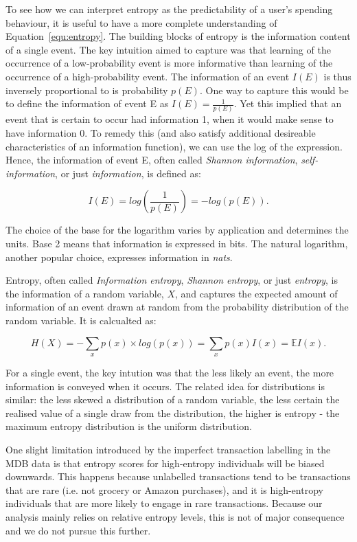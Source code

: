 To see how we can interpret entropy as the predictability of a user's spending
behaviour, it is useful to have a more complete understanding of
Equation~\ref{equ:entropy}. The building blocks of entropy is the information
content of a single event. The key intuition \citet{shannon1948mathematical}
aimed to capture was that learning of the occurrence of a low-probability event
is more informative than learning of the occurrence of a high-probability
event. The information of an event $I(E)$ is thus inversely proportional to is
probability $p(E)$. One way to capture this would be to define the information
of event E as $I(E) = \frac{1}{p(E)}$. Yet this implied that an event that is
certain to occur had information 1, when it would make sense to have
information 0. To remedy this (and also satisfy additional desireable
characteristics of an information function), we can use the log of the
expression. Hence, the information of event E, often called \textit{Shannon
information}, \textit{self-information}, or just \textit{information}, is
defined as:

\begin{equation}
    I(E) = log\left(\frac{1}{p(E)}\right) = -log(p(E)).
\end{equation}

The choice of the base for the logarithm varies by application and determines
the units. Base 2 means that information is expressed in bits. The natural
logarithm, another popular choice, expresses information in \textit{nats}.

Entropy, often called \textit{Information entropy}, \textit{Shannon entropy},
or just \textit{entropy}, is the information of a random variable, $X$, and
captures the expected amount of information of an event drawn at random from
the probability distribution of the random variable. It is calcualted as:

\begin{equation}
    H(X) = -\sum_x p(x) \times log(p(x)) = \sum_x p(x)I(x) = \mathbb{E} I(x).
\end{equation}

For a single event, the key intution was that the less likely an event, the
more information is conveyed when it occurs. The related idea for distributions
is similar: the less skewed a distribution of a random variable, the less
certain the realised value of a single draw from the distribution, the higher
is entropy - the maximum entropy distribution is the uniform distribution.

One slight limitation introduced by the imperfect transaction labelling in the
MDB data is that entropy scores for high-entropy individuals will be biased
downwards. This happens because unlabelled transactions tend to be transactions
that are rare (i.e. not grocery or Amazon purchases), and it is high-entropy
individuals that are more likely to engage in rare transactions. Because our
analysis mainly relies on relative entropy levels, this is not of major
consequence and we do not pursue this further.


